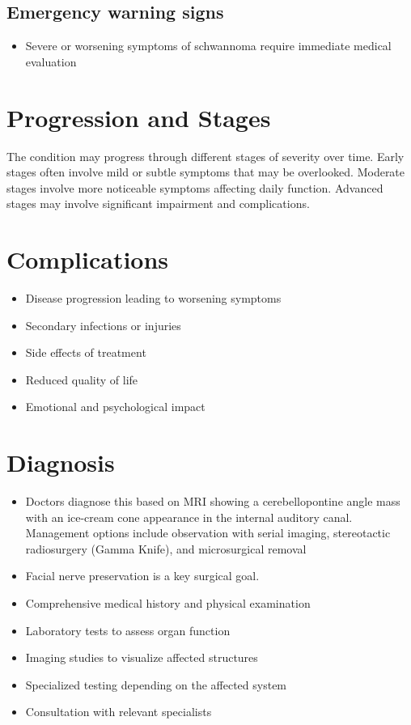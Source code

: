 \subsection{Emergency warning signs}
\begin{itemize}[noitemsep]
  \item Severe or worsening symptoms of schwannoma require immediate medical evaluation
\end{itemize}
\section{Progression and Stages}
The condition may progress through different stages of severity over time. Early stages often involve mild or subtle symptoms that may be overlooked. Moderate stages involve more noticeable symptoms affecting daily function. Advanced stages may involve significant impairment and complications.
\section{Complications}
\begin{itemize}[noitemsep]
  \item Disease progression leading to worsening symptoms
  \item Secondary infections or injuries
  \item Side effects of treatment
  \item Reduced quality of life
  \item Emotional and psychological impact
\end{itemize}
\section{Diagnosis}
\begin{itemize}[noitemsep]
  \item Doctors diagnose this based on MRI showing a cerebellopontine angle mass with an ice-cream cone appearance in the internal auditory canal. Management options include observation with serial imaging, stereotactic radiosurgery (Gamma Knife), and microsurgical removal
  \item Facial nerve preservation is a key surgical goal.
  \item Comprehensive medical history and physical examination
  \item Laboratory tests to assess organ function
  \item Imaging studies to visualize affected structures
  \item Specialized testing depending on the affected system
  \item Consultation with relevant specialists
\end{itemize}
